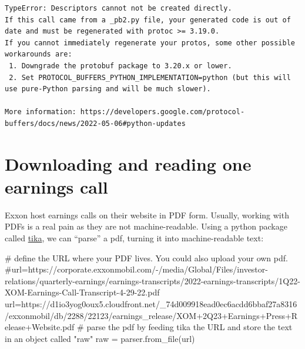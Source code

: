 \documentclass[
  letterpaper,
  DIV=11,
  numbers=noendperiod]{scrreprt}
\newenvironment{Shaded}{\begin{snugshade}}{\end{snugshade}}
\newcommand{\CommentTok}[1]{\textcolor[rgb]{0.37,0.37,0.37}{#1}}
\newcommand{\NormalTok}[1]{\textcolor[rgb]{0.00,0.23,0.31}{#1}}
\newcommand{\OperatorTok}[1]{\textcolor[rgb]{0.37,0.37,0.37}{#1}}
\newcommand{\StringTok}[1]{\textcolor[rgb]{0.13,0.47,0.30}{#1}}
\begin{document}
\begin{verbatim}
TypeError: Descriptors cannot not be created directly.
If this call came from a _pb2.py file, your generated code is out of date and must be regenerated with protoc >= 3.19.0.
If you cannot immediately regenerate your protos, some other possible workarounds are:
 1. Downgrade the protobuf package to 3.20.x or lower.
 2. Set PROTOCOL_BUFFERS_PYTHON_IMPLEMENTATION=python (but this will use pure-Python parsing and will be much slower).

More information: https://developers.google.com/protocol-buffers/docs/news/2022-05-06#python-updates
\end{verbatim}

\hypertarget{downloading-and-reading-one-earnings-call}{%
\section{Downloading and reading one earnings
call}\label{downloading-and-reading-one-earnings-call}}

Exxon host earnings calls on their website in PDF form. Usually, working
with PDFs is a real pain as they are not machine-readable. Using a
python package called
\href{https://www.geeksforgeeks.org/parsing-pdfs-in-python-with-tika/}{tika},
we can ``parse'' a pdf, turning it into machine-readable text:

\begin{Shaded}
\begin{Highlighting}[]
\CommentTok{\# define the URL where your PDF lives. You could also upload your own pdf.}
\CommentTok{\#url=\textquotesingle{}https://corporate.exxonmobil.com/{-}/media/Global/Files/investor{-}relations/quarterly{-}earnings/earnings{-}transcripts/2022{-}earnings{-}transcripts/1Q22{-}XOM{-}Earnings{-}Call{-}Transcript{-}4{-}29{-}22.pdf\textquotesingle{}}
\NormalTok{url}\OperatorTok{=}\StringTok{\textquotesingle{}https://d1io3yog0oux5.cloudfront.net/\_74d009918ead0ec6acdd6bbaf27a8316/exxonmobil/db/2288/22123/earnings\_release/XOM+2Q23+Earnings+Press+Release+Website.pdf\textquotesingle{}}
\CommentTok{\# parse the pdf by feeding tika the URL and store the text in an object called "raw" }
\NormalTok{raw }\OperatorTok{=}\NormalTok{ parser.from\_file(url)}
\end{Highlighting}
\end{Shaded}
\end{document}
